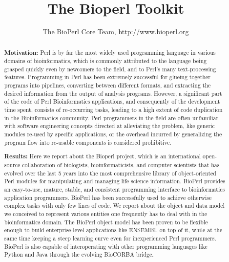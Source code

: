 \documentclass{article}
\begin{document}
\begin{twocolumn}
\title{The Bioperl Toolkit}
\author{The BioPerl Core Team, http://www.bioperl.org}
\maketitle

\begin{abstract}

{\bf Motivation:} Perl is by far the most widely used programming
language in various domains of bioinformatics, which is commonly
attributed to the language being grasped quickly even by newcomers to
the field, and to Perl's many text-processing features. Programming in
Perl has been extremely successful for glueing together programs into
pipelines, converting between different formats, and extracting the
desired information from the output of analysis programs. However, a
significant part of the code of Perl Bioinformatics applications, and
consequently of the development time spent, consists of re-occurring
tasks, leading to a high extent of code duplication in the
Bioinformatics community. Perl programmers in the field are often
unfamiliar with software engineering concepts directed at alleviating
the problem, like generic modules re-used by specific applications, or
the overhead incurred by generalizing the program flow into re-usable
components is considered prohibitive.

{\bf Results:} Here we report about the Bioperl project, which is an
international open-source collaboration of biologists,
bioinformaticists, and computer scientists that has evolved over the
last 5 years into the most comprehensive library of
object-oriented Perl modules for manipulating and managing life
science information. BioPerl provides an easy-to-use, mature, stable,
and consistent programming interface to bioinformatics application
programmers. BioPerl has been successfully used to achieve
otherwise complex tasks with only few lines of code. We report about
the object and data model we conceived to represent various entities
one frequently has to deal with in the bioinformatics domain. The
BioPerl object model has been proven to be flexible enough to build
enterprise-level applications like ENSEMBL on top of it, while at the
same time keeping a steep learning curve even for inexperienced Perl
programmers. BioPerl is also capable of interoperating with other
programming languages like Python and Java through the evolving
BioCORBA bridge.


\end{abstract}
\end{twocolumn}
\end{document}

